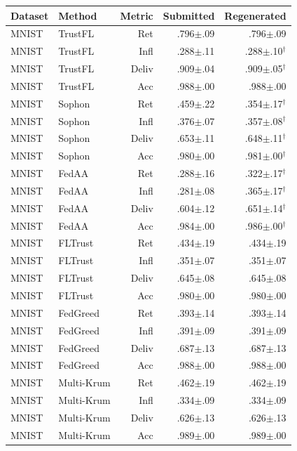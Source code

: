 \begin{tabular}{llrrr}
\toprule
Dataset & Method & Metric & Submitted & Regenerated \\
\midrule
MNIST & TrustFL & Ret & .796$\pm$.09 & .796$\pm$.09 \\
MNIST & TrustFL & Infl & .288$\pm$.11 & .288$\pm$.10$^{\dagger}$ \\
MNIST & TrustFL & Deliv & .909$\pm$.04 & .909$\pm$.05$^{\dagger}$ \\
MNIST & TrustFL & Acc & .988$\pm$.00 & .988$\pm$.00 \\
MNIST & Sophon & Ret & .459$\pm$.22 & .354$\pm$.17$^{\dagger}$ \\
MNIST & Sophon & Infl & .376$\pm$.07 & .357$\pm$.08$^{\dagger}$ \\
MNIST & Sophon & Deliv & .653$\pm$.11 & .648$\pm$.11$^{\dagger}$ \\
MNIST & Sophon & Acc & .980$\pm$.00 & .981$\pm$.00$^{\dagger}$ \\
MNIST & FedAA & Ret & .288$\pm$.16 & .322$\pm$.17$^{\dagger}$ \\
MNIST & FedAA & Infl & .281$\pm$.08 & .365$\pm$.17$^{\dagger}$ \\
MNIST & FedAA & Deliv & .604$\pm$.12 & .651$\pm$.14$^{\dagger}$ \\
MNIST & FedAA & Acc & .984$\pm$.00 & .986$\pm$.00$^{\dagger}$ \\
MNIST & FLTrust & Ret & .434$\pm$.19 & .434$\pm$.19 \\
MNIST & FLTrust & Infl & .351$\pm$.07 & .351$\pm$.07 \\
MNIST & FLTrust & Deliv & .645$\pm$.08 & .645$\pm$.08 \\
MNIST & FLTrust & Acc & .980$\pm$.00 & .980$\pm$.00 \\
MNIST & FedGreed & Ret & .393$\pm$.14 & .393$\pm$.14 \\
MNIST & FedGreed & Infl & .391$\pm$.09 & .391$\pm$.09 \\
MNIST & FedGreed & Deliv & .687$\pm$.13 & .687$\pm$.13 \\
MNIST & FedGreed & Acc & .988$\pm$.00 & .988$\pm$.00 \\
MNIST & Multi-Krum & Ret & .462$\pm$.19 & .462$\pm$.19 \\
MNIST & Multi-Krum & Infl & .334$\pm$.09 & .334$\pm$.09 \\
MNIST & Multi-Krum & Deliv & .626$\pm$.13 & .626$\pm$.13 \\
MNIST & Multi-Krum & Acc & .989$\pm$.00 & .989$\pm$.00 \\

\end{tabular}

